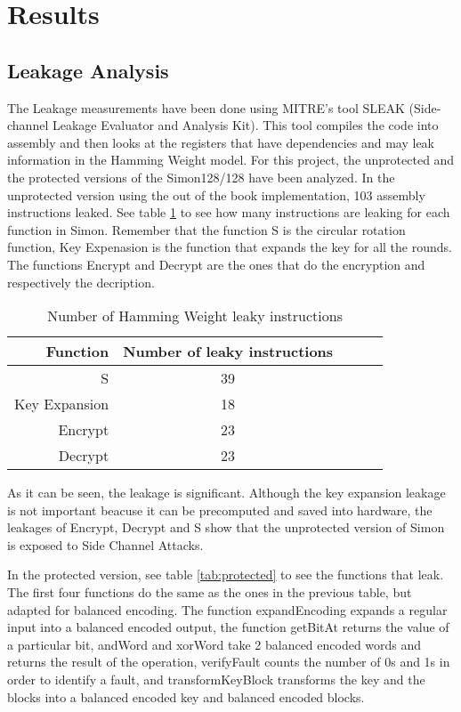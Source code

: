 \documentclass[conference]{IEEEtran}
\begin{document}
\section{Results}

\subsection{Leakage Analysis}

The Leakage measurements have been done using MITRE's tool SLEAK (Side-channel Leakage Evaluator and Analysis Kit). This tool compiles the code into assembly and then looks at the registers that have dependencies and may leak information in the Hamming Weight model. For this project, the unprotected and the protected versions of the Simon128/128 have been analyzed. In the unprotected version using the out of the book implementation, 103 assembly instructions leaked. See table \ref{tab:unprotected} to see how many instructions are leaking for each function in Simon. Remember that the function S is the circular rotation function, Key Expenasion is the function that expands the key for all the rounds. The functions Encrypt and Decrypt are the ones that do the encryption and respectively the decription.

\begin{table}[htbp]
  \renewcommand{\arraystretch}{1.3}
  \caption{Number of Hamming Weight leaky instructions}
  \vspace{0.05 in}
  \label{tab:unprotected}
  \centering
  \begin{tabular}{r|cccp{0.5in}}
    Function & Number of leaky instructions \\ \hline
    S  & 39 \\
    Key Expansion & 18 \\
    Encrypt & 23 \\
    Decrypt & 23 \\
  \end{tabular}
\end{table}

As it can be seen, the leakage is significant. Although the key expansion leakage is not important beacuse it can be precomputed and saved into hardware, the leakages of Encrypt, Decrypt and S show that the unprotected version of Simon is exposed to Side Channel Attacks.

In the protected version, see table \ref{tab:protected} to see the functions that leak. The first four functions do the same as the ones in the previous table, but adapted for balanced encoding. The function expandEncoding expands a regular input into a balanced encoded output, the function getBitAt returns the value of a particular bit, andWord and xorWord take 2 balanced encoded words and returns the result of the operation, verifyFault counts the number of 0s and 1s in order to identify a fault, and transformKeyBlock transforms the key and the blocks into a balanced encoded key and balanced encoded blocks. 
\end{document}

